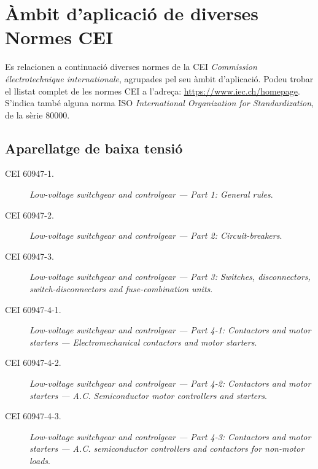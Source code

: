 \section{Àmbit d'aplicació de diverses Normes CEI}\label{sec:normes_IEC}

Es relacionen a continuació diverses normes de la CEI \textit{Commission électrotechnique internationale}, agrupades pel seu àmbit d'aplicació. Podeu trobar el llistat complet de les normes CEI a l'adreça: \href{https://www.iec.ch/homepage}{https://www.iec.ch/homepage}. S'indica també alguna norma ISO \textit{International Organization for Standardization}, de la sèrie 80000.

\subsection*{Aparellatge de baixa tensió}
\begin{description}
	
	\item [\hspace{5mm}CEI 60947-1.] \textit{Low-voltage switchgear and controlgear --- Part 1: General rules}.
	\item [\hspace{5mm}CEI 60947-2.] \textit{Low-voltage switchgear and controlgear --- Part 2: Circuit-breakers}.
	\item [\hspace{5mm}CEI 60947-3.] \textit{Low-voltage switchgear and controlgear --- Part 3: Switches, disconnectors, switch-dis\-con\-nec\-tors and fuse-combination units}.
	\item [\hspace{5mm}CEI 60947-4-1.] \textit{Low-voltage switchgear and controlgear --- Part 4-1: Contactors and motor starters ---  Electromechanical contactors and motor starters}.
	\item [\hspace{5mm}CEI 60947-4-2.] \textit{Low-voltage switchgear and controlgear --- Part 4-2: Contactors and motor starters ---  A.C. Semiconductor motor controllers and starters}.
	\item [\hspace{5mm}CEI 60947-4-3.] \textit{Low-voltage switchgear and controlgear --- Part 4-3: Contactors and motor starters ---  A.C. semiconductor controllers and contactors for non-motor loads}.
\end{description}



